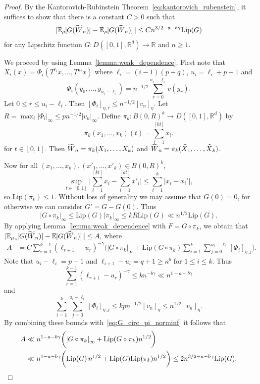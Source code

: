 \documentclass[11pt,a4paper,reqno,oneside]{amsart}
\newcommand{\R}{\ensuremath{\mathbb{R}}}%
\newcommand{\norminf}[1]{\left|#1\right|_\infty}
\newcommand{\Ex}[2][]{\mathbb{E}_{#1\!\!}\left[#2\right]}
\newcommand{\Lip}{\mathrm{Lip}}
\newcommand{\shat}[1]{\vphantom{#1}\smash[t]{\widehat{#1}}}
\newcommand{\stilde}[1]{\vphantom{#1}\smash[t]{\widetilde{#1}}}
\newcommand{\dsemi}[1]{[#1]_{\eta}}
\newcommand{\sdsemi}[2]{[#1]_{\eta,#2}}
\theoremstyle{definition}
\theoremstyle{remark}
\numberwithin{equation}{section}
\begin{document}
\begin{proof}
	By the Kantorovich-Rubinstein Theorem~\eqref{eq:kantorovich_rubenstein}, it suffices to show that there is a constant $C>0$ such that \[|\Ex[\mu]{G(\stilde W_n)} - \Ex[\mu]{G(\shat W_n)}|\le Cn^{3/2-a-b\gamma}\Lip(G)\] for any Lipschitz function $G:{D([0,1],\R^d)\to \R}$ and $n\ge 1$.

		We proceed by using Lemma~\ref{lemma:weak_dependence}. First note that
		$ X_i(x)=\varPhi_i(T^{\ell_i}x,\dots,T^{u_i}x) $
		where $ \ell_i=(i-1)(p+q)$, $u_i=\ell_i+p-1 $ and \[ \varPhi_i(y_0,\dots,y_{u_i-\ell_i})=n^{-1/2}\sum_{r=0}^{u_i-\ell_i}v(y_r). \]
		Let $ 0\le r\le u_i-\ell_i $. Then $ \sdsemi{\varPhi_i}{r}\le n^{-1/2}\dsemi{v_n}.$ Let $ R=\max_i \norminf{\varPhi_i}\le pn^{-1/2}\norminf{v_n}.$ Define $ \pi_k:B(0,R)^k\to D([0,1],\R^d) $ by
		\[ \pi_k(x_1,\dots,x_k)(t)=\sum_{i=1}^{[kt]}x_i. \]
		for $ t\in [0,1] $. Then $ \stilde W_n=\pi_k(X_1,\dots,X_k) $ and $ \shat W_n = \pi_k(\shat X_1,\dots,\shat X_k) $.
		
		Now for all $ (x_1,\dots,x_k),(x'_1,\dots,x'_k)\in B(0,R)^k $,
		\[ \sup_{t\in[0,1]}\Bigg|\sum_{i=1}^{[kt]}x_i-\sum_{i=1}^{[kt]}x'_i\Bigg|\le \sum_{i=1}^k|x_i-x_i'|, \]
		so $ \Lip(\pi_k)\le 1 $. Without loss of generality we may assume that $ G(0)=0 $, for otherwise we can consider $ G'=G-G(0) $. Thus 
		\begin{equation}\label{eq:G_circ_pi_norminf}
			\norminf{G\circ \pi_k}\le \Lip(G)\norminf{\pi_k}\le kR\Lip(G)\ll n^{1/2}\Lip(G).
		\end{equation}
		By applying Lemma~\ref{lemma:weak_dependence} with $ F=G\circ \pi_k $, we obtain that 
		$ |\Ex[\mu_n]{G(\stilde W_n)}-\Ex{G(\shat W_n)}|\le A,$ where 
		\begin{align*}
			A &= C\sum_{r=1}^{k-1}(\ell_{r+1}-u_r)^{-\gamma}\biggl(\norminf{G\circ \pi_k}+\Lip(G\circ \pi_k)\sum_{i=1}^{k}\sum_{j=0}^{u_i-\ell_i}\sdsemi{\varPhi_i}{j}\biggr).
		\end{align*}
		Note that $ u_i-\ell_i=p-1 $ and $ \ell_{i+1}-u_i=q+1\ge n^b $ for $ 1\le i\le k $. Thus
		\begin{equation*}
			\sum_{r=1}^{k-1}(\ell_{r+1}-u_r)^{-\gamma}\le kn^{-b\gamma}\ll n^{1-a-b\gamma}
		\end{equation*}
		and 
		\begin{equation*}
			\sum_{i=1}^{k}\sum_{j=0}^{u_i-\ell_i}\sdsemi{\varPhi_i}{j}\le kpn^{-1/2}\dsemi{v_n}\le n^{1/2}\dsemi{v_n}.
		\end{equation*}
		By combining these bounds with~\eqref{eq:G_circ_pi_norminf} it follows that
		\begin{align*}
			A&\ll n^{1-a-b\gamma}\biggl(\norminf{G\circ \pi_k}+\Lip(G\circ \pi_k)n^{1/2}\biggr)\\
			&\ll n^{1-a-b\gamma}\biggl(\Lip(G)\,n^{1/2}+\Lip(G)\Lip(\pi_k)n^{1/2}\biggr)\le 2n^{3/2-a-b\gamma}\Lip(G).\qedhere
		\end{align*}
	\end{proof}
\end{document}
